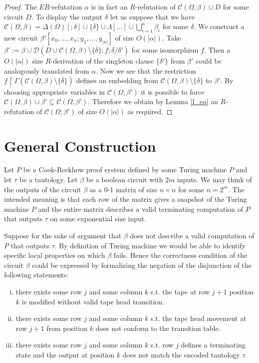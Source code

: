 \documentclass{LMCS}
\theoremstyle{plain}\newtheorem{satz}[thm]{Satz}
\begin{document}
\begin{thm}
\begin{proof}
The $ER$-refutation $\alpha$ is in fact an $R$-refutation of ${\mathcal C}(\Omega, \beta) \cup D$ for some circuit $D$. To display the output $\delta$ let us suppose that we have ${\mathcal C}(\Omega, \beta) = \Delta(\Omega) [;\delta] \cup \{ \overline{\delta} \} \cup \Lambda[...] \cup \displaystyle{\bigcup_{i=1}^n \beta_i}$ for some $\delta$. We construct a new circuit $\beta'[x_0,...,x_n;y_1,...,y_{|n|}]$ of size $O(|\alpha|)$. Take $\beta' := \beta \cup {\mathcal D}(D \cup {\mathcal C}(\Omega,\beta)\setminus \{ \overline{\delta} \}; f;\delta/\delta')$ for some isomorphism $f$. Then a $O(|\alpha|)$ size $R$-derivation of the singleton clause $\{ \delta' \}$ from $\beta'$ could be analogously translated from $\alpha$. Now we see that the restriction $f \restriction \Gamma({\mathcal C}(\Omega,\beta) \setminus \{ \overline{\delta} \})$ defines an embedding from ${\mathcal C}(\Omega,\beta) \setminus \{ \overline{\delta} \}$ to $\beta'$. By choosing appropriate variables in ${\mathcal C}(\Omega,\beta')$ it is possible to force ${\mathcal C}(\Omega,\beta) \cup \beta' \subseteq {\mathcal C}(\Omega,\beta')$. Therefore we obtain by Lemma \ref{l_eq} an $R$-refutation of ${\mathcal C}(\Omega,\beta')$ of size $O(|\alpha|)$ as required.
\end{proof}
\end{thm}

\section{General Construction}
\label{s_gen}

Let $P$ be a Cook-Reckhow proof system defined by some Turing machine $P$ and let $\tau$ be a tautology. Let $\beta$ be a boolean circuit with $2m$ inputs. We may think of the outputs of the circuit $\beta$ as a 0-1 matrix of size $n \times n$ for some $n = 2^m$. The intended meaning is that each row of the matrix gives a snapshot of the Turing machine $P$ and the entire matrix describes a valid terminating computation of $P$ that outputs $\tau$ on some exponential size input.

Suppose for the sake of argument that $\beta$ does not describe a valid computation of $P$ that outputs $\tau$. By definition of Turing machine we would be able to identify specific local properties on which $\beta$ fails. Hence the correctness condition of the circuit $\beta$ could be expressed by formalizing the negation of the disjunction of the following statements:
\begin{enumerate}[(i)]
\item
there exists some row $j$ and some column $k$ s.t. the tape at row $j+1$ position $k$ is modified without valid tape head transition.
\item
there exists some row $j$ and some column $k$ s.t. the tape head movement at row $j+1$ from position $k$ does not conform to the transition table.
\item
there exists some row $j$ and some column $k$ s.t. row $j$ defines a terminating state and the output at position $k$ does not match the encoded tautology $\tau$.
\end{enumerate}
\end{document}
